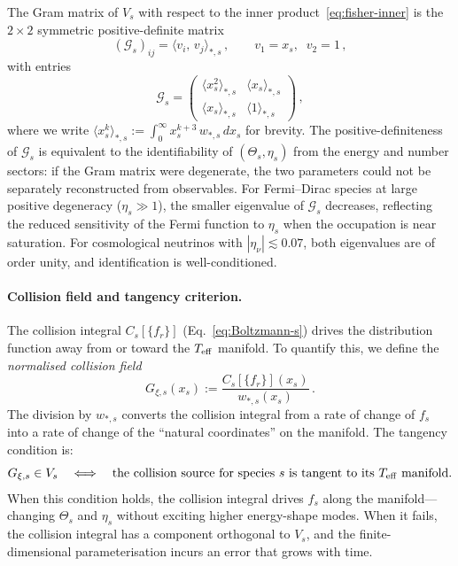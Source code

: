 The Gram matrix of $V_s$ with respect to the inner
product~\eqref{eq:fisher-inner} is the $2 \times 2$
symmetric positive-definite matrix
\begin{equation}\label{eq:Gram-matrix}
(\mathcal{G}_s)_{ij}
= \langle v_i,\, v_j \rangle_{*,s}\,,
\qquad
v_1 = x_s,\;\; v_2 = 1\,,
\end{equation}
with entries
\begin{equation}\label{eq:Gram-entries}
\mathcal{G}_s
= \begin{pmatrix}
\langle x_s^2 \rangle_{*,s}
  & \langle x_s \rangle_{*,s} \\[4pt]
\langle x_s \rangle_{*,s}
  & \langle 1 \rangle_{*,s}
\end{pmatrix}\,,
\end{equation}
where we write $\langle x_s^k \rangle_{*,s}
:= \int_0^\infty x_s^{k+3}\, w_{*,s}\, dx_s$ for
brevity.  The positive-definiteness of $\mathcal{G}_s$
is equivalent to the identifiability of $(\Theta_s,
\eta_s)$ from the energy and number sectors: if the
Gram matrix were degenerate, the two parameters could
not be separately reconstructed from observables.  For
Fermi--Dirac species at large positive degeneracy
($\eta_s \gg 1$), the smaller eigenvalue of
$\mathcal{G}_s$ decreases, reflecting the reduced
sensitivity of the Fermi function to $\eta_s$ when the
occupation is near saturation.  For cosmological
neutrinos with $|\eta_\nu| \lesssim 0.07$, both
eigenvalues are of order unity, and identification is
well-conditioned.


\paragraph{Collision field and tangency criterion.}

The collision integral $C_s[\{f_r\}]$
(Eq.~\ref{eq:Boltzmann-s}) drives the distribution
function away from or toward the $T_{\mathrm{eff}}$ manifold.  To
quantify this, we define the \emph{normalised collision
field}
\begin{equation}\label{eq:collision-field}
G_{\xi,s}(x_s)
:= \frac{C_s[\{f_r\}](x_s)}{w_{*,s}(x_s)}\,.
\end{equation}
The division by $w_{*,s}$ converts the collision
integral from a rate of change of $f_s$ into a rate of
change of the ``natural coordinates'' on the manifold.
The tangency condition is:
\begin{equation}\label{eq:tangency-criterion}
G_{\xi,s} \in V_s
\quad \Longleftrightarrow \quad
\text{the collision source for species $s$ is tangent
to its $T_{\mathrm{eff}}$ manifold.}
\end{equation}
When this condition holds, the collision integral
drives $f_s$ along the manifold---changing $\Theta_s$
and $\eta_s$ without exciting higher energy-shape
modes.  When it fails, the collision integral has a
component orthogonal to $V_s$, and the
finite-dimensional parameterisation incurs an error
that grows with time.


